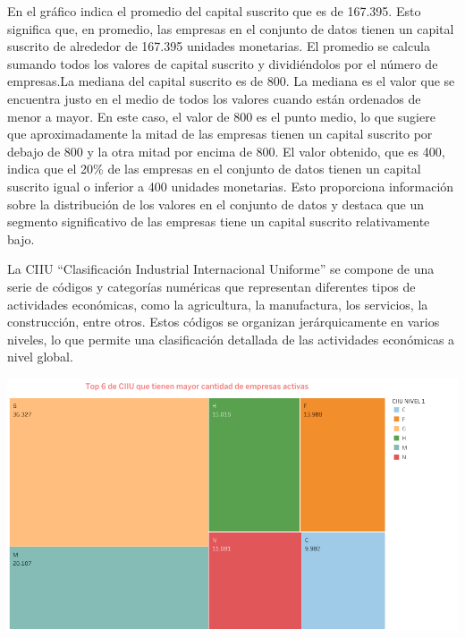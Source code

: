 \documentclass[
]{article}
\begin{document}
En el gráfico indica el promedio del capital suscrito que es de 167.395.
Esto significa que, en promedio, las empresas en el conjunto de datos
tienen un capital suscrito de alrededor de 167.395 unidades monetarias.
El promedio se calcula sumando todos los valores de capital suscrito y
dividiéndolos por el número de empresas.La mediana del capital suscrito
es de 800. La mediana es el valor que se encuentra justo en el medio de
todos los valores cuando están ordenados de menor a mayor. En este caso,
el valor de 800 es el punto medio, lo que sugiere que aproximadamente la
mitad de las empresas tienen un capital suscrito por debajo de 800 y la
otra mitad por encima de 800. El valor obtenido, que es 400, indica que
el 20\% de las empresas en el conjunto de datos tienen un capital
suscrito igual o inferior a 400 unidades monetarias. Esto proporciona
información sobre la distribución de los valores en el conjunto de datos
y destaca que un segmento significativo de las empresas tiene un capital
suscrito relativamente bajo.

La CIIU ``Clasificación Industrial Internacional Uniforme'' se compone
de una serie de códigos y categorías numéricas que representan
diferentes tipos de actividades económicas, como la agricultura, la
manufactura, los servicios, la construcción, entre otros. Estos códigos
se organizan jerárquicamente en varios niveles, lo que permite una
clasificación detallada de las actividades económicas a nivel global.

\includegraphics{imagenes/Hoja 4.png}
\end{document}
